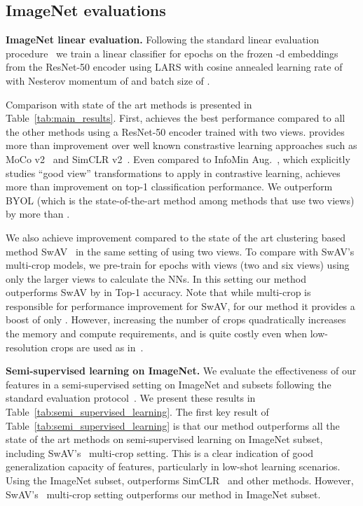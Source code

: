 \subsection{ImageNet evaluations}

\noindent\textbf{ImageNet linear evaluation.} Following the standard linear evaluation procedure~\cite{grill2020bootstrap,chen2020simple} we train a linear classifier for  epochs on the frozen -d embeddings from the ResNet-50 encoder using LARS with cosine annealed learning rate of  with Nesterov momentum of  and batch size of . 

Comparison with state of the art methods is presented in Table~\ref{tab:main_results}. First, \methodname achieves the best performance compared to all the other methods using a ResNet-50 encoder trained with two views. \methodname provides more than  improvement over well known constrastive learning approaches such as MoCo v2~\cite{chen2020improved} and SimCLR v2~\cite{chen2020big}. Even compared to InfoMin Aug.\ \cite{tian2020makes}, which explicitly studies ``good view'' transformations to apply in contrastive learning, \methodname achieves more than  improvement on top-1 classification performance. We outperform BYOL\cite{grill2020bootstrap} (which is the state-of-the-art method among methods that use two views) by more than .
 
We also achieve  improvement compared to the state of the art clustering based method SwAV~\cite{caron2020unsupervised} in the same setting of using two views. 
To compare with SwAV's multi-crop models, we pre-train for  epochs with  views (two  and six  views) using only the larger views to calculate the NNs. In this setting our method outperforms SwAV by  in Top-1 accuracy. Note that while multi-crop is responsible for  performance improvement for SwAV, for our method it provides a boost of only .
However, increasing the number of crops quadratically increases the memory and compute requirements, and is quite costly even when low-resolution crops are used as in~\cite{caron2020unsupervised}.



\noindent\textbf{Semi-supervised learning on ImageNet.} We evaluate the effectiveness of our features in a semi-supervised setting on ImageNet  and  subsets following the standard evaluation protocol~\cite{grill2020bootstrap, chen2020big}. 
We present these results in Table~\ref{tab:semi_supervised_learning}. The first key result of Table~\ref{tab:semi_supervised_learning} is that our method outperforms all the state of the art methods on semi-supervised learning on ImageNet  subset, including SwAV's~\cite{caron2020unsupervised} multi-crop setting.
This is a clear indication of good generalization capacity of \methodname features, particularly in low-shot learning scenarios. Using the ImageNet  subset, \methodname outperforms SimCLR~\cite{chen2020simple} and other methods. However, SwAV's~\cite{caron2020unsupervised} multi-crop setting outperforms our method in ImageNet  subset.



